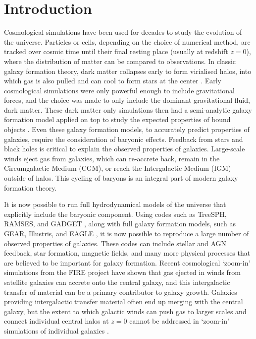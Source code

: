 \section{Introduction}
\label{sec:introduction}
Cosmological simulations have been used for decades to study the evolution of
the universe. Particles or cells, depending on the choice of numerical
method, are tracked over cosmic time until their final resting place (usually
at redshift $z=0$), where the distribution of matter can be compared to
observations. In classic galaxy formation theory, dark matter collapses early
to form virialised halos, into which gas is also pulled and can cool to form
stars at the center \citep{Mo2010}. Early cosmological simulations were only
powerful enough to include gravitational forces, and the choice was made to
only include the dominant gravitational fluid, dark matter. These dark matter
only simulations \citep[see e.g.][]{frenk1988, springel_simulations_2005}
then had a semi-analytic galaxy formation model applied on top to study the
expected properties of bound objects \citep[see e.g.][]{porter_2014,
henriques_2015, lacey_2016}. Even these galaxy formation models, to
accurately predict properties of galaxies, require the consideration of
baryonic effects. Feedback from stars and black holes is critical to explain
the observed properties of galaxies. Large-scale winds eject gas from
galaxies, which can re-accrete back, remain in the Circumgalactic Medium
(CGM), or reach the Intergalactic Medium (IGM) outside of halos. This cycling
of baryons is an integral part of modern galaxy formation theory.

It is now possible to run full hydrodynamical models of the universe that
explicitly include the baryonic component. Using codes such as TreeSPH,
RAMSES, and GADGET \citep{Hernquist1989, teyssier2002, Springel2005}, along
with full galaxy formation models, such as GEAR, Illustris, and EAGLE
\citep{Revaz2011, vogelsberger_properties_2014, Schaye2015}, it is now
possible to reproduce a large number of observed properties of galaxies.
These codes can include stellar and AGN feedback, star formation, magnetic
fields, and many more physical processes that are believed to be important
for galaxy formation. Recent cosmological `zoom-in' simulations from the FIRE
project \citep{fireproject2014} have shown that gas ejected in winds from
satellite galaxies can accrete onto the central galaxy, and this
intergalactic transfer of material can be a primary contributor to galaxy
growth. Galaxies providing intergalactic transfer material often end up
merging with the central galaxy, but the extent to which galactic winds can
push gas to larger scales and connect individual central halos at $z=0$
cannot be addressed in `zoom-in' simulations of individual galaxies
\citep{anglesalcazar2016}.


